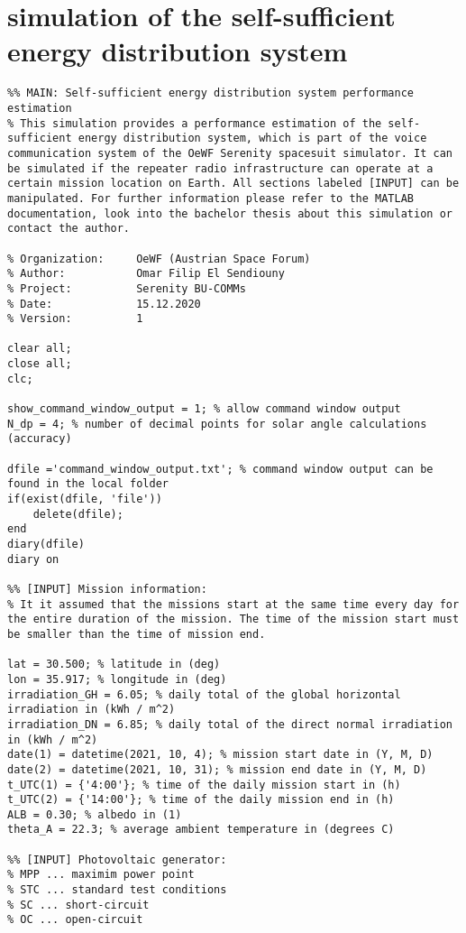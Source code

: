 \section{\altmatlab simulation of the self-sufficient energy distribution system} \label{sec:matlab_code}
\begin{lstlisting}
%% MAIN: Self-sufficient energy distribution system performance estimation
% This simulation provides a performance estimation of the self-sufficient energy distribution system, which is part of the voice communication system of the OeWF Serenity spacesuit simulator. It can be simulated if the repeater radio infrastructure can operate at a certain mission location on Earth. All sections labeled [INPUT] can be manipulated. For further information please refer to the MATLAB documentation, look into the bachelor thesis about this simulation or contact the author.

% Organization:     OeWF (Austrian Space Forum)
% Author:           Omar Filip El Sendiouny
% Project:          Serenity BU-COMMs
% Date:             15.12.2020
% Version:          1 

clear all;
close all;
clc;

show_command_window_output = 1; % allow command window output
N_dp = 4; % number of decimal points for solar angle calculations (accuracy)

dfile ='command_window_output.txt'; % command window output can be found in the local folder
if(exist(dfile, 'file'))
    delete(dfile); 
end
diary(dfile)
diary on

%% [INPUT] Mission information:
% It it assumed that the missions start at the same time every day for the entire duration of the mission. The time of the mission start must be smaller than the time of mission end.

lat = 30.500; % latitude in (deg)
lon = 35.917; % longitude in (deg)
irradiation_GH = 6.05; % daily total of the global horizontal irradiation in (kWh / m^2) 
irradiation_DN = 6.85; % daily total of the direct normal irradiation in (kWh / m^2)
date(1) = datetime(2021, 10, 4); % mission start date in (Y, M, D)
date(2) = datetime(2021, 10, 31); % mission end date in (Y, M, D)
t_UTC(1) = {'4:00'}; % time of the daily mission start in (h)
t_UTC(2) = {'14:00'}; % time of the daily mission end in (h)
ALB = 0.30; % albedo in (1)
theta_A = 22.3; % average ambient temperature in (degrees C)

%% [INPUT] Photovoltaic generator:
% MPP ... maximim power point
% STC ... standard test conditions
% SC ... short-circuit
% OC ... open-circuit


\end{lstlisting}
